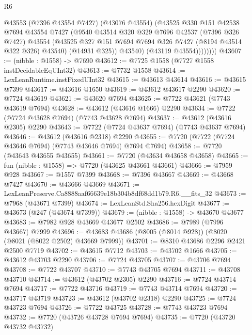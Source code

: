 \begin{lexlean}{R6}
\begin{coremodule}
                @43553
                  (@7396 @43554 @7427)
                  (@43076 @43554)
                  (@43525
                    @330
                    @151
                    @42538
                    @7694
                    @43554
                    @7427
                    (@9540
                      @43514
                      @320
                      @329
                      @7696
                      @42537
                      (@7396 @326 @7427)
                      @43554
                      (@43525 @327 @151 @7694 @7694 @326 @7427 (@8194 @43514 @322 @326) @43540)
                      (@14931 @325))
                    @43540)
                  (@43119 @43554))))))))
@43607 := (nibble : @1558) -> @7690
@43612 := @7725 @1558 (@7727 @1558 instDecidableEqUInt32)
@43613 := @7732 @1558
@43614 := LexLeanRuntime.instFixedUInt32
@43615 := @43613 @43614
@43616 := @43615 @7399
@43617 := @43616 @1650
@43619 := @43612 @43617 @2290
@43620 := @7724 @43619
@43621 := @43620 @7694
@43625 := @7722 @43621 (@7743 @43619 @7694)
@43628 := @43612 (@43616 @1666) @2290
@43634 := @7722 (@7724 @43628 @7694) (@7743 @43628 @7694)
@43637 := @43612 (@43616 @2305) @2290
@43643 := @7722 (@7724 @43637 @7694) (@7743 @43637 @7694)
@43646 := @43612 (@43616 @2318) @2290
@43655 := @7720 (@7722 (@7724 @43646 @7694) (@7743 @43646 @7694) @7694 @7694)
@43658 := @7720 (@43643 @43655 @43655)
@43661 := @7720 (@43634 @43658 @43658)
@43665 := fun (nibble : @1558) => @7720 (@43625 @43661 @43661)
@43666 := @7959 @928
@43667 := @1557 @7399
@43668 := @7396 @43667
@43669 := @43668 @7427
@43670 := @43666 @43669
@43671 := LexLeanPreserve.Ca8888aaf66639e18b304b8df68dd1b79.R6.__fits_32
@43673 := @7968 (@43671 @7399)
@43674 := LexLeanStd.Sha256.hexDigit
@43677 := @43673 (@247 (@43674 @7399))
@43679 := (nibble : @1558) -> @43670 @43677
@43683 := @7982 @928 @43669 @43677 @2502
@43686 := @7989 (@7996 @43667) @7999
@43696 := @43683 @43686 (@8005 (@8014 @928)) (@8020 (@8021 (@8022 @2502) @43669 @7999))
@43701 := @8310 @43686 @2296 @2421 @2500 @7719
@43702 := @43615 @7712
@43703 := @43702 @1666
@43705 := @43612 @43703 @2290
@43706 := @7724 @43705
@43707 := @43706 @7694
@43708 := @7722 @43707
@43710 := @7743 @43705 @7694
@43711 := @43708 @43710
@43714 := @43612 (@43702 @2305) @2290
@43716 := @7724 @43714 @7694
@43717 := @7722 @43716
@43719 := @7743 @43714 @7694
@43720 := @43717 @43719
@43723 := @43612 (@43702 @2318) @2290
@43725 := @7724 @43723 @7694
@43726 := @7722 @43725
@43728 := @7743 @43723 @7694
@43732 := @7720 (@43726 @43728 @7694 @7694)
@43735 := @7720 (@43720 @43732 @43732)

\end{coremodule}
\end{lexlean}

